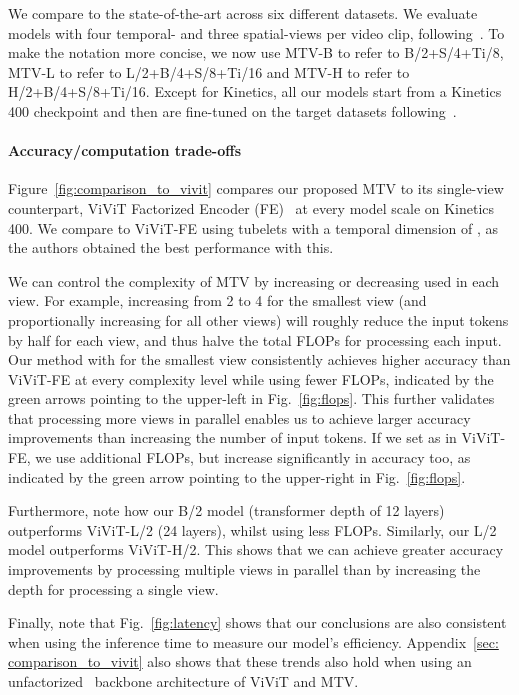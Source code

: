  We compare to the state-of-the-art across six different datasets.
We evaluate models with four temporal- and three spatial-views per video clip, following~\cite{arnab2021vivit}. 
To make the notation more concise, we now use MTV-B to refer to B/2+S/4+Ti/8, MTV-L to refer to L/2+B/4+S/8+Ti/16 and MTV-H to refer to H/2+B/4+S/8+Ti/16.
Except for Kinetics, all our models start from a Kinetics 400 checkpoint and then are fine-tuned on the target datasets following~\cite{arnab2021vivit,patrick2021keeping,fan2021multiscale}.


\paragraph{Accuracy/computation trade-offs}
Figure~\ref{fig:comparison_to_vivit} compares our proposed MTV to its single-view counterpart, ViViT Factorized Encoder (FE)~\cite{arnab2021vivit} at every model scale on Kinetics 400.
We compare to ViViT-FE using tubelets with a temporal dimension of , as the authors obtained the best performance with this.

We can control the complexity of MTV by increasing or decreasing  used in each view.
For example, increasing  from 2 to 4 for the smallest view (and proportionally increasing  for all other views) will roughly reduce the input tokens by half for each view, and thus halve the total FLOPs for processing each input.
Our method with  for the smallest view consistently achieves higher accuracy than ViViT-FE at every complexity level while using fewer FLOPs, indicated by the green arrows pointing to the upper-left in Fig.~\ref{fig:flops}.
This further validates that processing more views in parallel enables us to achieve larger accuracy improvements than increasing the number of input tokens.
If we set  as in ViViT-FE, we use additional FLOPs, but increase significantly in accuracy too, as indicated by the green arrow pointing to the upper-right in Fig.~\ref{fig:flops}.

Furthermore, note how our B/2 model (transformer depth of 12 layers) outperforms ViViT-L/2 (24 layers), whilst using less FLOPs.
Similarly, our L/2 model outperforms ViViT-H/2.
This shows that we can achieve greater accuracy improvements by processing multiple views in parallel than by increasing the depth for processing a single view.

Finally, note that Fig.~\ref{fig:latency} shows that our conclusions are also consistent when using the inference time to measure our model's efficiency.
Appendix~\ref{sec: comparison_to_vivit} also shows that these trends also hold when using an unfactorized~\cite{arnab2021vivit} backbone architecture of ViViT and MTV.


